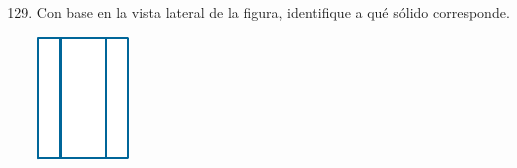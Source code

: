 \documentclass[11pt, a4paper]{article} %
\theoremstyle{dotlessP}
\theoremstyle{dotlessS}
\begin{document}
\begin{enumerate}[label=\color{dg}\theenumi.]
 \setcounter{enumi}{128}
  \normalsize
   \item {\color{db} Con base en la vista lateral de la figura, identifique a qué sólido corresponde.  } \\
	     \begin{center}
    \includegraphics[scale=1]{Figuras/129_1.pdf}
    \end{center}
        \begin{figure}[h!]
       \centering
       \qquad 
		\qquad 
        		\qquad 

\end{figure}
\end{enumerate}
\end{document}
